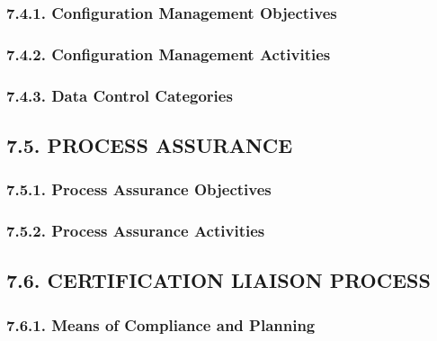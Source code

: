 \documentclass[
]{article}
\begin{document}
\hypertarget{configuration-management-objectives}{%
\subsubsection{7.4.1. Configuration Management
Objectives}\label{configuration-management-objectives}}

\hypertarget{configuration-management-activities}{%
\subsubsection{7.4.2. Configuration Management
Activities}\label{configuration-management-activities}}

\hypertarget{data-control-categories}{%
\subsubsection{7.4.3. Data Control
Categories}\label{data-control-categories}}

\hypertarget{process-assurance}{%
\subsection{7.5. PROCESS ASSURANCE}\label{process-assurance}}

\hypertarget{process-assurance-objectives}{%
\subsubsection{7.5.1. Process Assurance
Objectives}\label{process-assurance-objectives}}

\hypertarget{process-assurance-activities}{%
\subsubsection{7.5.2. Process Assurance
Activities}\label{process-assurance-activities}}

\hypertarget{certification-liaison-process}{%
\subsection{7.6. CERTIFICATION LIAISON
PROCESS}\label{certification-liaison-process}}

\hypertarget{means-of-compliance-and-planning}{%
\subsubsection{7.6.1. Means of Compliance and
Planning}\label{means-of-compliance-and-planning}}
\end{document}
